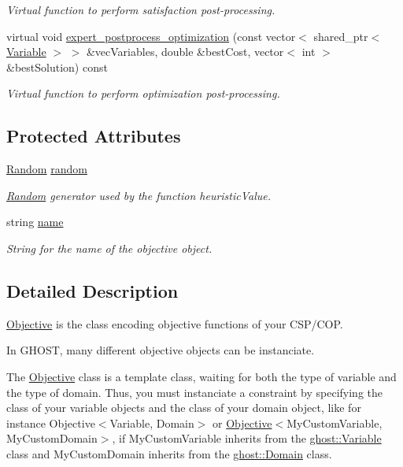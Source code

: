 \begin{DoxyCompactItemize}
\begin{DoxyCompactList}\small\item\em Virtual function to perform satisfaction post-\/processing. \end{DoxyCompactList}\item 
virtual void \hyperlink{classghost_1_1Objective_abd663f1d16db153e58dc2684b2ab234e}{expert\-\_\-postprocess\-\_\-optimization} (const vector$<$ shared\-\_\-ptr$<$ \hyperlink{classghost_1_1Variable}{Variable} $>$ $>$ \&vec\-Variables, double \&best\-Cost, vector$<$ int $>$ \&best\-Solution) const 
\begin{DoxyCompactList}\small\item\em Virtual function to perform optimization post-\/processing. \end{DoxyCompactList}\end{DoxyCompactItemize}
\subsection*{Protected Attributes}
\begin{DoxyCompactItemize}
\item 
\hyperlink{classghost_1_1Random}{Random} \hyperlink{classghost_1_1Objective_a86081d1ebbab1fe6f781841d9ac8d546}{random}
\begin{DoxyCompactList}\small\item\em \hyperlink{classghost_1_1Random}{Random} generator used by the function heuristic\-Value. \end{DoxyCompactList}\item 
string \hyperlink{classghost_1_1Objective_af5bf0605c193884ad7f53593dabe8b85}{name}
\begin{DoxyCompactList}\small\item\em String for the name of the objective object. \end{DoxyCompactList}\end{DoxyCompactItemize}


\subsection{Detailed Description}
\hyperlink{classghost_1_1Objective}{Objective} is the class encoding objective functions of your C\-S\-P/\-C\-O\-P. 

In G\-H\-O\-S\-T, many different objective objects can be instanciate.

The \hyperlink{classghost_1_1Objective}{Objective} class is a template class, waiting for both the type of variable and the type of domain. Thus, you must instanciate a constraint by specifying the class of your variable objects and the class of your domain object, like for instance Objective$<$\-Variable, Domain$>$ or \hyperlink{classghost_1_1Objective}{Objective}$<$My\-Custom\-Variable, My\-Custom\-Domain$>$, if My\-Custom\-Variable inherits from the \hyperlink{classghost_1_1Variable}{ghost\-::\-Variable} class and My\-Custom\-Domain inherits from the \hyperlink{classghost_1_1Domain}{ghost\-::\-Domain} class.

